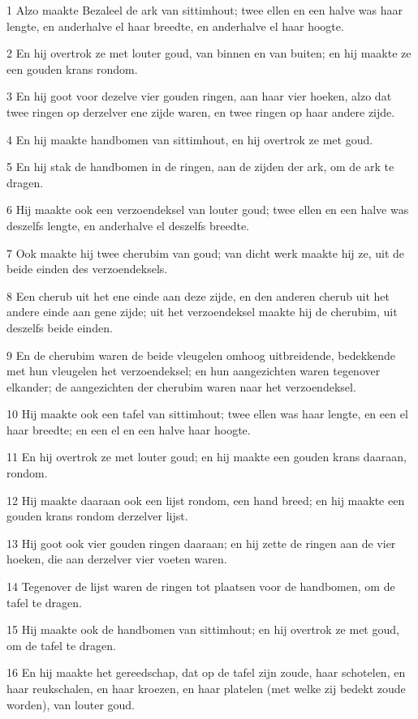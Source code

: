\par 1 Alzo maakte Bezaleel de ark van sittimhout; twee ellen en een halve was haar lengte, en anderhalve el haar breedte, en anderhalve el haar hoogte.
\par 2 En hij overtrok ze met louter goud, van binnen en van buiten; en hij maakte ze een gouden krans rondom.
\par 3 En hij goot voor dezelve vier gouden ringen, aan haar vier hoeken, alzo dat twee ringen op derzelver ene zijde waren, en twee ringen op haar andere zijde.
\par 4 En hij maakte handbomen van sittimhout, en hij overtrok ze met goud.
\par 5 En hij stak de handbomen in de ringen, aan de zijden der ark, om de ark te dragen.
\par 6 Hij maakte ook een verzoendeksel van louter goud; twee ellen en een halve was deszelfs lengte, en anderhalve el deszelfs breedte.
\par 7 Ook maakte hij twee cherubim van goud; van dicht werk maakte hij ze, uit de beide einden des verzoendeksels.
\par 8 Een cherub uit het ene einde aan deze zijde, en den anderen cherub uit het andere einde aan gene zijde; uit het verzoendeksel maakte hij de cherubim, uit deszelfs beide einden.
\par 9 En de cherubim waren de beide vleugelen omhoog uitbreidende, bedekkende met hun vleugelen het verzoendeksel; en hun aangezichten waren tegenover elkander; de aangezichten der cherubim waren naar het verzoendeksel.
\par 10 Hij maakte ook een tafel van sittimhout; twee ellen was haar lengte, en een el haar breedte; en een el en een halve haar hoogte.
\par 11 En hij overtrok ze met louter goud; en hij maakte een gouden krans daaraan, rondom.
\par 12 Hij maakte daaraan ook een lijst rondom, een hand breed; en hij maakte een gouden krans rondom derzelver lijst.
\par 13 Hij goot ook vier gouden ringen daaraan; en hij zette de ringen aan de vier hoeken, die aan derzelver vier voeten waren.
\par 14 Tegenover de lijst waren de ringen tot plaatsen voor de handbomen, om de tafel te dragen.
\par 15 Hij maakte ook de handbomen van sittimhout; en hij overtrok ze met goud, om de tafel te dragen.
\par 16 En hij maakte het gereedschap, dat op de tafel zijn zoude, haar schotelen, en haar reukschalen, en haar kroezen, en haar platelen (met welke zij bedekt zoude worden), van louter goud.
